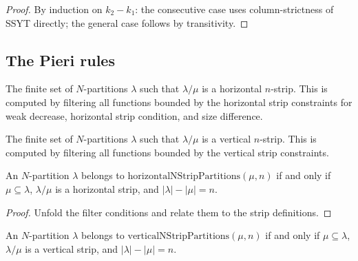 \begin{proof}
\leanok
By induction on $k_2 - k_1$: the consecutive case uses
column-strictness of SSYT directly; the general case follows by
transitivity.
\end{proof}

\subsection{The Pieri rules}

\begin{definition}
\label{def.sf.horizontal-n-strip-partitions}
\leanhelper
\leanok
The finite set of $N$-partitions $\lambda$ such that $\lambda/\mu$ is a
horizontal $n$-strip. This is computed by filtering all functions bounded
by the horizontal strip constraints for weak decrease, horizontal strip
condition, and size difference.
\end{definition}

\begin{definition}
\label{def.sf.vertical-n-strip-partitions}
\leanhelper
\leanok
The finite set of $N$-partitions $\lambda$ such that $\lambda/\mu$ is a
vertical $n$-strip. This is computed by filtering all functions bounded
by the vertical strip constraints.
\end{definition}

\begin{lemma}
\label{lem.sf.horizontal-strip-membership}
\leanhelper
\leanok
An $N$-partition $\lambda$ belongs to $\mathrm{horizontalNStripPartitions}(\mu, n)$
if and only if $\mu \subseteq \lambda$, $\lambda/\mu$ is a horizontal strip,
and $|\lambda| - |\mu| = n$.
\end{lemma}

\begin{proof}
\leanok
Unfold the filter conditions and relate them to the strip definitions.
\end{proof}

\begin{lemma}
\label{lem.sf.vertical-strip-membership}
\leanhelper
\leanok
An $N$-partition $\lambda$ belongs to $\mathrm{verticalNStripPartitions}(\mu, n)$
if and only if $\mu \subseteq \lambda$, $\lambda/\mu$ is a vertical strip,
and $|\lambda| - |\mu| = n$.
\end{lemma}

